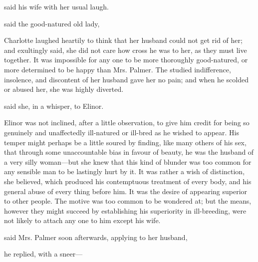  said his wife with her usual laugh. 


 said the good-natured old lady, 

Charlotte laughed heartily to think that her husband could not get rid of her; and exultingly said, she did not care how cross he was to her, as they must live together. It was impossible for any one to be more thoroughly good-natured, or more determined to be happy than Mrs. Palmer. The studied indifference, insolence, and discontent of her husband gave her no pain; and when he scolded or abused her, she was highly diverted.

 said she, in a whisper, to Elinor. 

Elinor was not inclined, after a little observation, to give him credit for being so genuinely and unaffectedly ill-natured or ill-bred as he wished to appear. His temper might perhaps be a little soured by finding, like many others of his sex, that through some unaccountable bias in favour of beauty, he was the husband of a very silly woman---but she knew that this kind of blunder was too common for any sensible man to be lastingly hurt by it. It was rather a wish of distinction, she believed, which produced his contemptuous treatment of every body, and his general abuse of every thing before him. It was the desire of appearing superior to other people. The motive was too common to be wondered at; but the means, however they might succeed by establishing his superiority in ill-breeding, were not likely to attach any one to him except his wife.

 said Mrs. Palmer soon afterwards,  applying to her husband, 

 he replied, with a sneer---

